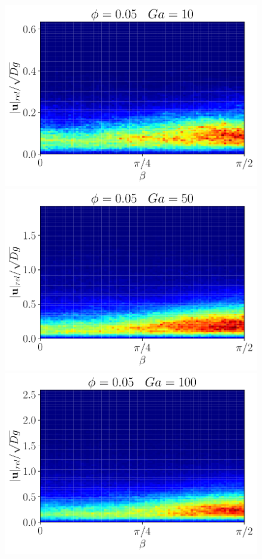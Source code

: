 \begin{figure}[h!]
    \centering
    \includegraphics[scale = 0.9,height = \size]{image/N_10/beta/2DMAP_beta_v_rel_dmin_10_Bo1PHI0_05mu_r0_42Ga10.pdf}
    \includegraphics[scale = 0.9,height = \size]{image/N_10/beta/2DMAP_beta_v_rel_dmin_10_Bo1PHI0_05mu_r0_42Ga50.pdf}
    \includegraphics[scale = 0.9,height = \size]{image/N_10/beta/2DMAP_beta_v_rel_dmin_10_Bo1PHI0_05mu_r0_42Ga100.pdf}

\end{figure}
